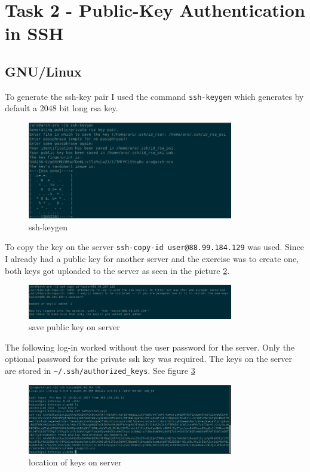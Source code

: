 \section{Task 2 - Public-Key Authentication in SSH}

\subsection{GNU/Linux}
To generate the ssh-key pair I used the command \verb|ssh-keygen| which generates by default a 2048 bit long rsa key. \\

\begin{figure}
	\centering
	\includegraphics[width=0.8\textwidth]{Assignment0x01/image/ssh-keygen}
	\caption{ssh-keygen} \label{img:key-gen}
\end{figure}

To copy the key on the server \verb|ssh-copy-id user@88.99.184.129| was used. Since I already had a public key for another server and the exercise was to create one, both keys got uploaded to the server as seen in the picture \ref{img:ssh-copy-id}.

\begin{figure}
	\centering
	\includegraphics[width=0.8\textwidth]{Assignment0x01/image/ssh-copy-id}
	\caption{save public key on server} \label{img:ssh-copy-id}
\end{figure}

The following log-in worked without the user password for the server. Only the optional password for the private ssh key was required. The keys on the server are stored in \verb|~/.ssh/authorized_keys|. See figure \ref{img:key_server}
\begin{figure}
	\centering
	\includegraphics[width=0.8\textwidth]{Assignment0x01/image/ssh_login_key_path}
	\caption{location of keys on server} \label{img:key_server}
\end{figure}

